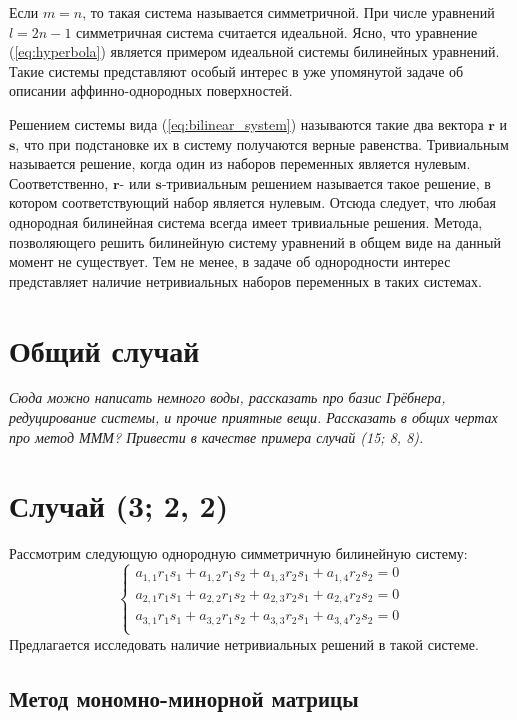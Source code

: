 Если $m = n$, то такая система называется симметричной. При числе уравнений $l = 2n - 1$ симметричная 
система считается идеальной. Ясно, что уравнение (\ref{eq:hyperbola}) является примером идеальной системы 
билинейных уравнений. Такие системы представляют особый интерес в уже упомянутой задаче об описании 
аффинно-однородных поверхностей. 

Решением системы вида (\ref{eq:bilinear_system}) называются такие два вектора $\mathbf{r}$ и $
\mathbf{s}$, что при подстановке их в систему получаются верные равенства. Тривиальным называется 
решение, когда один из наборов переменных является нулевым. Соответственно, $\mathbf{r}$- или $
\mathbf{s}$-тривиальным решением называется такое решение, в котором соответствующий набор является 
нулевым. Отсюда следует, что любая однородная билинейная система всегда имеет тривиальные решения. 
Метода, позволяющего решить билинейную систему уравнений в общем виде на данный момент не существует. 
Тем не менее, в задаче об однородности интерес представляет наличие нетривиальных наборов переменных 
в таких системах. 

\section{Общий случай} 
\textit{Сюда можно написать немного воды, рассказать про базис Грёбнера, редуцирование системы, и прочие 
приятные вещи. Рассказать в общих чертах про метод МММ? Привести в качестве примера случай (15; 8, 8).}

\section{Случай (3; 2, 2)}

Рассмотрим следующую однородную симметричную билинейную систему: 
\begin{equation}\label{eq:trivial}
	\begin{cases}
		a_{1,1} r_1 s_1 + a_{1,2} r_1 s_2 + a_{1,3} r_2 s_1 + a_{1,4} r_2 s_2 = 0 \\
		a_{2,1} r_1 s_1 + a_{2,2} r_1 s_2 + a_{2,3} r_2 s_1 + a_{2,4} r_2 s_2 = 0 \\
		a_{3,1} r_1 s_1 + a_{3,2} r_1 s_2 + a_{3,3} r_2 s_1 + a_{3,4} r_2 s_2 = 0 \\
	\end{cases}
\end{equation}
Предлагается исследовать наличие нетривиальных решений в такой системе.

\subsection{Метод мономно-минорной матрицы}

